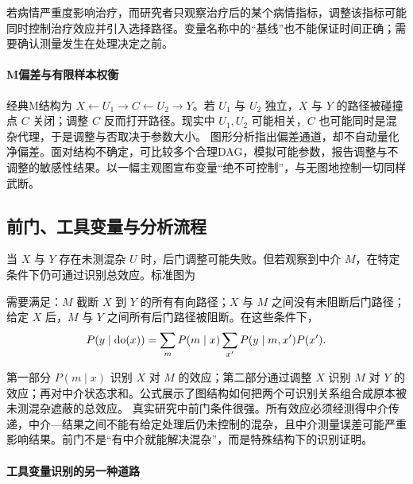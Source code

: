 若病情严重度影响治疗，而研究者只观察治疗后的某个病情指标，调整该指标可能同时控制治疗效应并引入选择路径。变量名称中的“基线”也不能保证时间正确；需要确认测量发生在处理决定之前。

\paragraph{M偏差与有限样本权衡}

经典M结构为 $X\leftarrow U_1\rightarrow C\leftarrow U_2\rightarrow Y$。若 $U_1$ 与 $U_2$ 独立，$X$ 与 $Y$ 的路径被碰撞点 $C$ 关闭；调整 $C$ 反而打开路径。现实中 $U_1,U_2$ 可能相关，$C$ 也可能同时是混杂代理，于是调整与否取决于参数大小。
图形分析指出偏差通道，却不自动量化净偏差。面对结构不确定，可比较多个合理DAG，模拟可能参数，报告调整与不调整的敏感性结果。以一幅主观图宣布变量“绝不可控制”，与无图地控制一切同样武断。

\subsection{前门、工具变量与分析流程}

当 $X$ 与 $Y$ 存在未测混杂 $U$ 时，后门调整可能失败。但若观察到中介 $M$，在特定条件下仍可通过识别总效应。标准图为

\begin{center}
\end{center}

需要满足：$M$ 截断 $X$ 到 $Y$ 的所有有向路径；$X$ 与 $M$ 之间没有未阻断后门路径；给定 $X$ 后，$M$ 与 $Y$ 之间所有后门路径被阻断。在这些条件下，
\[
P(y\mid\operatorname{do}(x))=
\sum_m P(m\mid x)
\sum_{x'}P(y\mid m,x')P(x').
\]

第一部分 $P(m\mid x)$ 识别 $X$ 对 $M$ 的效应；第二部分通过调整 $X$ 识别 $M$ 对 $Y$ 的效应；再对中介状态求和。公式展示了图结构如何把两个可识别关系组合成原本被未测混杂遮蔽的总效应。
真实研究中前门条件很强。所有效应必须经测得中介传递，中介---结果之间不能有给定处理后仍未控制的混杂，且中介测量误差可能严重影响结果。前门不是“有中介就能解决混杂”，而是特殊结构下的识别证明。

\paragraph{工具变量识别的另一种道路}

